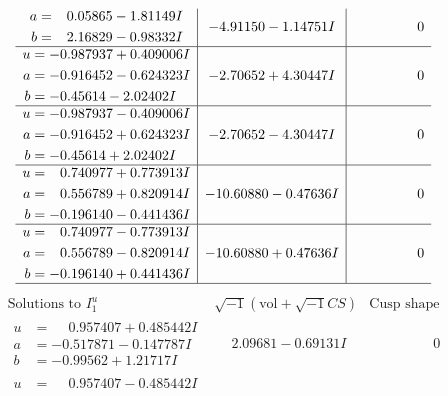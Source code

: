 \documentclass[1p]{elsarticle_modified}
\theoremstyle{definition}
\newcommand{\I}{\sqrt{-1}}
\begin{document}
$$\begin{array}{c|c|c}
\begin{aligned}
a &= \phantom{-}0.05865 - 1.81149 I \\
b &= \phantom{-}2.16829 - 0.98332 I\end{aligned}
 & -4.91150 - 1.14751 I & \phantom{-0.000000 } 0 \\ \hline\begin{aligned}
u &= -0.987937 + 0.409006 I \\
a &= -0.916452 - 0.624323 I \\
b &= -0.45614 - 2.02402 I\end{aligned}
 & -2.70652 + 4.30447 I & \phantom{-0.000000 } 0 \\ \hline\begin{aligned}
u &= -0.987937 - 0.409006 I \\
a &= -0.916452 + 0.624323 I \\
b &= -0.45614 + 2.02402 I\end{aligned}
 & -2.70652 - 4.30447 I & \phantom{-0.000000 } 0 \\ \hline\begin{aligned}
u &= \phantom{-}0.740977 + 0.773913 I \\
a &= \phantom{-}0.556789 + 0.820914 I \\
b &= -0.196140 - 0.441436 I\end{aligned}
 & -10.60880 - 0.47636 I & \phantom{-0.000000 } 0 \\ \hline\begin{aligned}
u &= \phantom{-}0.740977 - 0.773913 I \\
a &= \phantom{-}0.556789 - 0.820914 I \\
b &= -0.196140 + 0.441436 I\end{aligned}
 & -10.60880 + 0.47636 I & \phantom{-0.000000 } 0\\
 \hline 
 \end{array}$$\newpage$$\begin{array}{c|c|c}  
\text{Solutions to }I^u_{1}& \I (\text{vol} + \sqrt{-1}CS) & \text{Cusp shape}\\
 \hline 
\begin{aligned}
u &= \phantom{-}0.957407 + 0.485442 I \\
a &= -0.517871 - 0.147787 I \\
b &= -0.99562 + 1.21717 I\end{aligned}
 & \phantom{-}2.09681 - 0.69131 I & \phantom{-0.000000 } 0 \\ \hline\begin{aligned}
u &= \phantom{-}0.957407 - 0.485442 I \\

\end{aligned}
\end{array}$$
\end{document}
